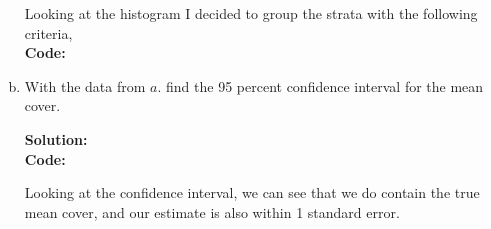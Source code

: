 \documentclass[12pt]{article}
\makeatletter
\theoremstyle{homework}
\newenvironment{exercise}[1]
{\def\@currentlabel{#1}\exercisecore}
{\endexercisecore}
\newcommand{\localhead}[1]{\par\smallskip\noindent\textbf{#1}\nobreak\\}%
\newcommand\solution{\localhead{Solution:}}
\makeatother
\begin{document}
\begin{exercise}{5}
\begin{enumerate}[a.]
\begin{figure}[H]
\begin{center}
            \end{center}
        \end{figure}
        Looking at the histogram I decided to group the strata with the following criteria,\\
        \textbf{Code:}
        \begin{center}
            
        \end{center}
        \vspace{.15in}


        \item With the data from $a.$ find the 95 percent confidence interval for the mean cover. \\
        \solution 
        \textbf{Code:}
        \begin{center}
            
        \end{center}
        Looking at the confidence interval, we can see that we do contain the true mean cover, and our estimate
        is also within 1 standard error. 
    \end{enumerate}
    
\end{exercise}
\end{document}
